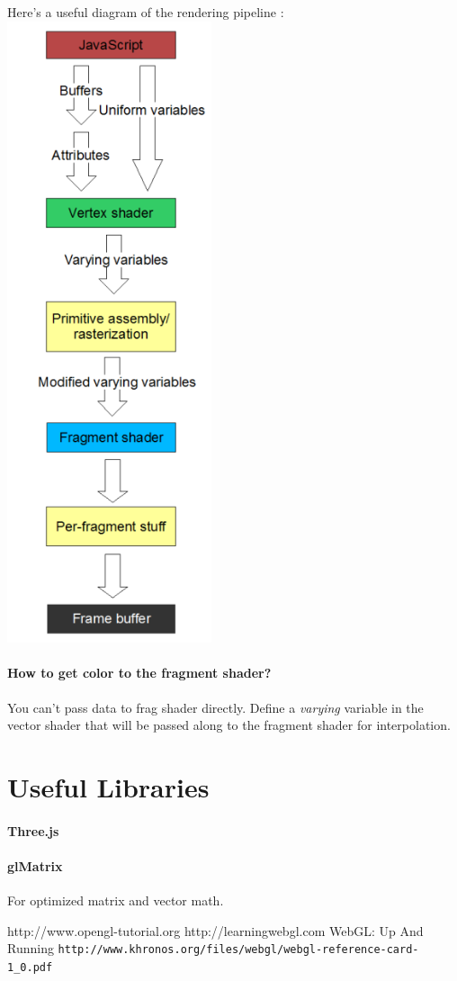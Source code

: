 \documentclass[12pt]{article}
\begin{document}
Here's a useful diagram of the rendering pipeline \cite{learnwebgl}: \\
\includegraphics[width=60mm]{img/simple-rendering-pipeline.png}

\paragraph{How to get color to the fragment shader?} You can't pass data to frag shader 
directly. Define a \emph{varying} variable in the vector shader that will be passed
along to the fragment shader for interpolation. 

\section{Useful Libraries}
\paragraph{Three.js} %
\paragraph{glMatrix} For optimized matrix and vector math.

\begin{thebibliography}{9}
	 http://www.opengl-tutorial.org
	 http://learningwebgl.com
	 WebGL: Up And Running
	 \verb|http://www.khronos.org/files/webgl/webgl-reference-card-1_0.pdf|
\end{thebibliography}
\end{document}
